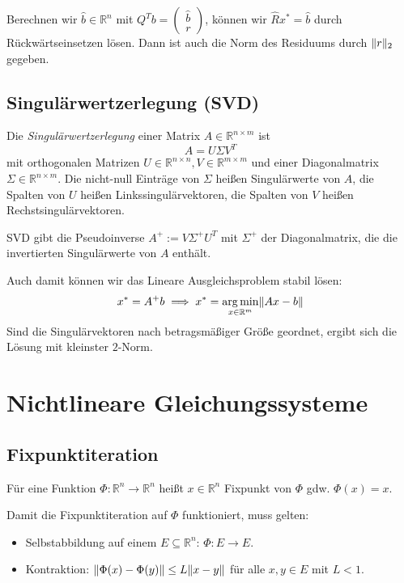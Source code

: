\documentclass[a4paper,parskip=half*,DIV=15,fontsize=11pt]{scrartcl}
\DeclarePairedDelimiter\norm{\lVert}{\rVert}
\DeclareMathOperator*\argmin{arg\,min}
\begin{document}
Berechnen wir $\hat{b} \in \mathbb{R}^n$ mit $Q^T b = \begin{pmatrix} \hat{b} \\ r \end{pmatrix}$, können wir $\hat{R}x^\ast = \hat{b}$  durch Rückwärtseinsetzen lösen. Dann ist auch die Norm des Residuums durch $\norm{r}_2$ gegeben.

\subsection{Singulärwertzerlegung (SVD)}

Die \emph{Singulärwertzerlegung} einer Matrix $A \in \mathbb{R}^{n \times m}$ ist
\[A = U\Sigma V^T\]
mit orthogonalen Matrizen $U \in \mathbb{R}^{n \times n}, V \in \mathbb{R}^{m \times m}$ und einer Diagonalmatrix $\Sigma \in \mathbb{R}^{n \times m}$. Die nicht-null Einträge von $\Sigma$ heißen Singulärwerte von $A$, die Spalten von $U$ heißen Linkssingulärvektoren, die Spalten von $V$ heißen Rechstsingulärvektoren.

SVD gibt die Pseudoinverse $A^+ := V\Sigma^+ U^T$ mit $\Sigma^+$ der Diagonalmatrix, die die invertierten Singulärwerte von $A$ enthält.

Auch damit können wir das Lineare Ausgleichsproblem stabil lösen:
\[ x^\ast = A^+ b \implies x^\ast = \argmin_{x \in \mathbb{R}^m} \norm*{Ax-b}\]
Sind die Singulärvektoren nach betragsmäßiger Größe geordnet, ergibt sich die Lösung mit kleinster $2$-Norm.

\section{Nichtlineare Gleichungssysteme}

\subsection{Fixpunktiteration}

Für eine Funktion $\Phi: \mathbb{R}^n \to \mathbb{R}^n$ heißt $x \in \mathbb{R}^n$ Fixpunkt von $\Phi$ gdw. $\Phi(x) = x$.

Damit die Fixpunktiteration auf $\Phi$ funktioniert, muss gelten:
\begin{itemize}
  \item Selbstabbildung auf einem $E \subseteq \mathbb{R}^n$: $\Phi : E \to E$.
  \item Kontraktion: $\norm{\Phi(x) - \Phi(y)} \leq L \norm{x-y}$ für alle $x,y \in E$ mit $L < 1$.
\end{itemize}
\end{document}

